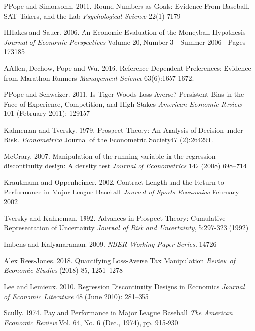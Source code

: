 \documentclass[dvipdfmx, 12pt]{article}
\begin{document}
\begin{thebibliography}{99}
  \bibitem PPope and Simonsohn. 2011.
  Round Numbers as Goals: Evidence From Baseball, SAT Takers, and the Lab
  \textit{Psychological Science} 22(1) 7179

  \bibitem HHakes and Sauer. 2006.
  An Economic Evaluation of the Moneyball Hypothesis
  \textit{Journal of Economic Perspectives} Volume 20, Number 3―Summer 2006―Pages 173185

  \bibitem AAllen, Dechow, Pope and Wu. 2016.
  Reference-Dependent Preferences: Evidence from Marathon Runners \textit{Management Science} 63(6):1657-1672.

  \bibitem PPope and Schweizer. 2011.
  Is Tiger Woods Loss Averse? Persistent Bias in the Face of Experience, Competition, and High Stakes
  \textit{American Economic Review} 101 (February 2011): 129157

  \bibitem{}Kahneman and Tversky. 1979.
  Prospect Theory: An Analysis of Decision under Risk.
  \textit{Econometrica}
  Journal of the Econometric Society47 (2):263291.

  \bibitem{}McCrary. 2007.
  Manipulation of the running variable in the regression discontinuity design: A density test
  \textit{Journal of Econometrics} 142 (2008) 698–714

  \bibitem{}Krautmann and Oppenheimer. 2002.
  Contract Length and the Return to Performance in Major League Baseball
  \textit{Journal of Sports Economics} February 2002

  \bibitem{}Tversky and Kahneman. 1992.
  Advances in Prospect Theory: Cumulative Representation of Uncertainty
  \textit{Journal of Risk and Uncertainty}, 5:297-323 (1992)

  \bibitem{}Imbens and Kalyanaraman. 2009.
  \textit{NBER Working Paper Series.} 14726

  \bibitem{}Alex Rees-Jones. 2018.
  Quantifying Loss-Averse Tax Manipulation
  \textit{Review of Economic Studies} (2018) 85, 1251–1278

  \bibitem{}Lee and Lemieux. 2010.
  Regression Discontinuity Designs in Economics
  \textit{Journal of Economic Literature} 48 (June 2010): 281–355

  \bibitem{}Scully. 1974.
  Pay and Performance in Major League Baseball
  \textit{The American Economic Review} Vol. 64, No. 6 (Dec., 1974), pp. 915-930
\end{thebibliography}
\end{document}
